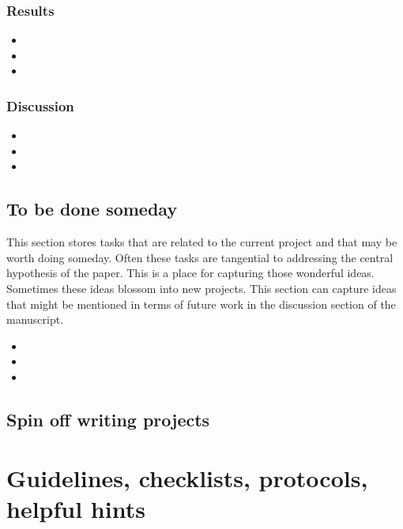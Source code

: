\documentclass[10pt,letterpaper]{article}
\newcommand{\bi}{\begin{itemize}}
\newcommand{\ei}{\end{itemize}}
\begin{document}
\subsubsection{Results}
\label{ssubsec:new-ideas:Results}

\bi
    \item  
    \item  
    \item  
\ei

\subsubsection{Discussion}
\label{ssubsec:new-ideas:Discussion}

\bi
    \item  
    \item  
    \item  
\ei

\subsection{To be done someday}
\label{subsec:someday}

This section stores tasks that are related to the current project and that may be worth doing someday.
Often these tasks are tangential to addressing the central hypothesis of the paper.
This is a place for capturing those wonderful ideas.
Sometimes these ideas blossom into new projects.
This section can capture ideas that might be mentioned in terms of future work in the discussion section of the manuscript.


\bi
    \item  
    \item  
    \item  
\ei

\subsection{Spin off writing projects}
\label{subsec:spinoffs}

\begin{description}
    \item [ ]
    \item [ ]
    \item [ ]
    \item [ ]
\end{description}



\section{Guidelines, checklists, protocols, helpful hints}
\label{sec:guides}
\end{document}
